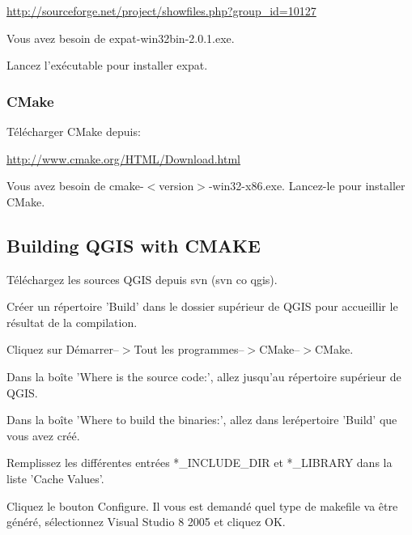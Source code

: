 \url{http://sourceforge.net/project/showfiles.php?group\_id=10127}

Vous avez besoin de expat-win32bin-2.0.1.exe.

Lancez l'exécutable pour installer expat.

\subsubsection{CMake}
Télécharger CMake depuis:

\url{http://www.cmake.org/HTML/Download.html}

Vous avez besoin de cmake-$<$version$>$-win32-x86.exe. Lancez-le pour installer CMake.

\subsection{Building QGIS with CMAKE}
Téléchargez les sources QGIS depuis svn (svn co  qgis).

Créer un répertoire 'Build' dans le dossier supérieur de QGIS pour accueillir le résultat de la compilation.

Cliquez sur Démarrer--$>$Tout les programmes--$>$CMake--$>$CMake. 

% 
% 
% 
% 

Dans la boîte 'Where is the source code:', allez jusqu'au répertoire supérieur de QGIS.

Dans la boîte 'Where to build the binaries:', allez dans lerépertoire 'Build' que vous avez créé.

Remplissez les différentes entrées *\_INCLUDE\_DIR et *\_LIBRARY dans la liste 'Cache Values'.

Cliquez le bouton Configure. Il vous est demandé quel type de makefile va être généré, sélectionnez Visual Studio 8 2005 et cliquez OK.

